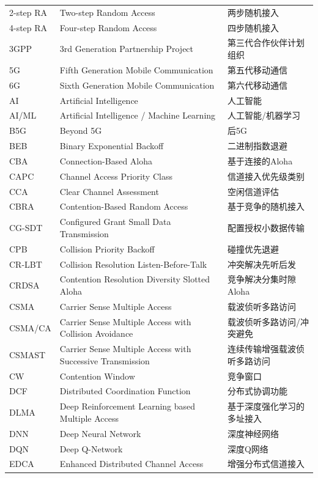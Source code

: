 \begin{longtable}{p{2.5cm}p{8cm}p{5cm}}
	2-step RA & Two-step Random Access & 两步随机接入 \\
	4-step RA & Four-step Random Access & 四步随机接入 \\
	3GPP & 3rd Generation Partnership Project & 第三代合作伙伴计划组织 \\
	5G & Fifth Generation Mobile Communication & 第五代移动通信 \\
	6G & Sixth Generation Mobile Communication & 第六代移动通信 \\
	AI & Artificial Intelligence & 人工智能 \\
	AI/ML & Artificial Intelligence / Machine Learning & 人工智能/机器学习 \\
	B5G & Beyond 5G & 后5G \\
	BEB & Binary Exponential Backoff & 二进制指数退避 \\
	CBA & Connection-Based Aloha & 基于连接的Aloha \\
	CAPC & Channel Access Priority Class & 信道接入优先级类别 \\
	CCA & Clear Channel Assessment & 空闲信道评估 \\
	CBRA & Contention-Based Random Access & 基于竞争的随机接入 \\
	CG-SDT & Configured Grant Small Data Transmission & 配置授权小数据传输 \\
	CPB & Collision Priority Backoff & 碰撞优先退避 \\
	CR-LBT & Collision Resolution Listen-Before-Talk & 冲突解决先听后发 \\
	CRDSA & Contention Resolution Diversity Slotted Aloha & 竞争解决分集时隙Aloha \\
	CSMA & Carrier Sense Multiple Access & 载波侦听多路访问 \\
	CSMA/CA & Carrier Sense Multiple Access with Collision Avoidance & 载波侦听多路访问/冲突避免 \\
	CSMAST & Carrier Sense Multiple Access with Successive Transmission & 连续传输增强载波侦听多路访问 \\
	CW & Contention Window & 竞争窗口 \\
	DCF & Distributed Coordination Function & 分布式协调功能 \\
	DLMA & Deep Reinforcement Learning based Multiple Access & 基于深度强化学习的多址接入 \\
	DNN & Deep Neural Network & 深度神经网络 \\
	DQN & Deep Q-Network & 深度Q网络 \\
	EDCA & Enhanced Distributed Channel Access & 增强分布式信道接入 \\

\end{longtable}
